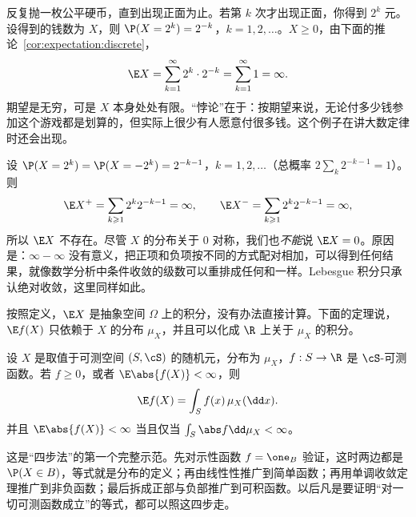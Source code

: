 \begin{example}\label{ex:expectation:st-petersburg}
反复抛一枚公平硬币，直到出现正面为止。若第 $k$ 次才出现正面，你得到 $2^k$ 元。设得到的钱数为 $X$，则 $\P(X=2^k)=2^{-k}$，$k=1,2,\dots$。$X\geqslant0$，由下面的推论~\ref{cor:expectation:discrete}，
\[
\E X=\sum_{k=1}^\infty2^k\cdot2^{-k}=\sum_{k=1}^\infty1=\infty .
\]
期望是无穷，可是 $X$ 本身处处有限。“悖论”在于：按期望来说，无论付多少钱参加这个游戏都是划算的，但实际上很少有人愿意付很多钱。这个例子在讲大数定律时还会出现。
\end{example}

\begin{example}[期望不存在]\label{ex:expectation:no-mean}
设 $\P(X=2^k)=\P(X=-2^k)=2^{-k-1}$，$k=1,2,\dots$（总概率 $2\sum_k2^{-k-1}=1$）。则
\[
\E X^+=\sum_{k\geqslant1}2^k2^{-k-1}=\infty,\qquad \E X^-=\sum_{k\geqslant1}2^k2^{-k-1}=\infty,
\]
所以 $\E X$ 不存在。尽管 $X$ 的分布关于 $0$ 对称，我们也\emph{不能}说 $\E X=0$。原因是：$\infty-\infty$ 没有意义，把正项和负项按不同的方式配对相加，可以得到任何结果，就像数学分析中条件收敛的级数可以重排成任何和一样。Lebesgue 积分只承认绝对收敛，这里同样如此。
\end{example}


按照定义，$\E X$ 是抽象空间 $\Omega$ 上的积分，没有办法直接计算。下面的定理说，$\E f(X)$ 只依赖于 $X$ 的分布 $\mu_X$，并且可以化成 $\R$ 上关于 $\mu_X$ 的积分。

\begin{theorem}[变量替换公式]\label{thm:expectation:change-of-variables}
设 $X$ 是取值于可测空间 $(S,\cS)$ 的随机元，分布为 $\mu_X$，$f:S\to\R$ 是 $\cS$-可测函数。若 $f\geqslant0$，或者 $\E\abs{f(X)}<\infty$，则
\[
\E f(X)=\int_Sf(x)\,\mu_X(\dd x).
\]
并且 $\E\abs{f(X)}<\infty$ 当且仅当 $\int_S\abs f\dd\mu_X<\infty$。
\end{theorem}

\begin{remark}[证明思路]
这是“四步法”的第一个完整示范。先对示性函数 $f=\one_B$ 验证，这时两边都是 $\P(X\in B)$，等式就是分布的定义；再由线性性推广到简单函数；再用单调收敛定理推广到非负函数；最后拆成正部与负部推广到可积函数。以后凡是要证明“对一切可测函数成立”的等式，都可以照这四步走。
\end{remark}


